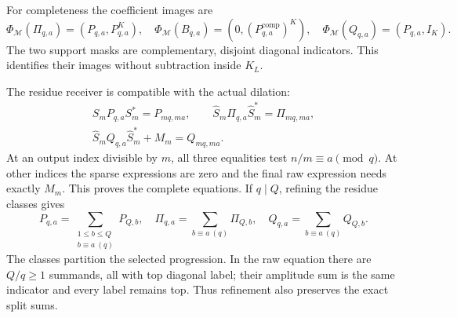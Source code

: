 For completeness the coefficient images are
\begin{equation}\tag{HCR22}
 \Phi_{\mathscr M}(\Pi_{q,a})=(P_{q,a},P_{q,a}^K),\quad
 \Phi_{\mathscr M}(B_{q,a})=(0,(P_{q,a}^{\mathrm{comp}})^K),\quad
 \Phi_{\mathscr M}(Q_{q,a})=(P_{q,a},I_K).
\end{equation}
The two support masks are complementary, disjoint diagonal
indicators. This identifies their images without subtraction
inside $K_L$.

The residue receiver is compatible with the actual dilation:
\begin{equation}\tag{HCR23}
\begin{gathered}
 S_mP_{q,a}S_m^*=P_{mq,ma},\qquad
 \widehat S_m\Pi_{q,a}\widehat S_m^*=\Pi_{mq,ma},\\
 \widehat S_mQ_{q,a}\widehat S_m^*+M_m=Q_{mq,ma}.
\end{gathered}
\end{equation}
At an output index divisible by $m$, all three equalities
test $n/m\equiv a\pmod q$. At other indices the sparse
expressions are zero and the final raw expression needs
exactly $M_m$. This proves the complete equations.
If $q\mid Q$, refining the residue classes gives
\begin{equation}\tag{HCR24}
 P_{q,a}=\sum_{\substack{1\le b\le Q\\b\equiv a\ (q)}}P_{Q,b},\quad
 \Pi_{q,a}=\sum_{b\equiv a\ (q)}\Pi_{Q,b},\quad
 Q_{q,a}=\sum_{b\equiv a\ (q)}Q_{Q,b}.
\end{equation}
The classes partition the selected progression. In the
raw equation there are $Q/q\ge1$ summands, all with
top diagonal label; their amplitude sum is the same
indicator and every label remains top. Thus refinement
also preserves the exact split sums.

